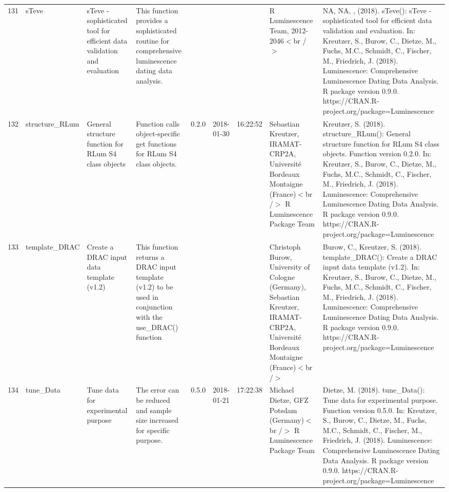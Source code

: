 \begin{table}[ht]
\begin{tabular}{rllllllll}
 \\ 
  131 & sTeve & sTeve - sophisticated tool for efficient data validation and evaluation & This function provides a sophisticated routine for comprehensive luminescence dating data analysis. &  &  &  & R Luminescence Team, 2012-2046$<$br /$>$ & NA, NA, ,  (2018). sTeve(): sTeve - sophisticated tool for efficient data validation and evaluation. In: Kreutzer, S., Burow, C., Dietze, M., Fuchs, M.C., Schmidt, C., Fischer, M., Friedrich, J. (2018). Luminescence: Comprehensive Luminescence Dating Data Analysis. R package version 0.9.0. https://CRAN.R-project.org/package=Luminescence
 \\ 
  132 & structure\_RLum & General structure function for RLum S4 class objects & Function calls object-specific get functions for RLum S4 class objects. & 0.2.0 & 2018-01-30 & 16:22:52
 & Sebastian Kreutzer, IRAMAT-CRP2A, Université Bordeaux Montaigne (France)$<$br /$>$  R Luminescence Package Team & Kreutzer, S. (2018). structure\_RLum(): General structure function for RLum S4 class objects. Function version 0.2.0. In: Kreutzer, S., Burow, C., Dietze, M., Fuchs, M.C., Schmidt, C., Fischer, M., Friedrich, J. (2018). Luminescence: Comprehensive Luminescence Dating Data Analysis. R package version 0.9.0. https://CRAN.R-project.org/package=Luminescence
 \\ 
  133 & template\_DRAC & Create a DRAC input data template (v1.2) & This function returns a DRAC input template (v1.2) to be used in conjunction with the use\_DRAC() function &  &  &  & Christoph Burow, University of Cologne (Germany), Sebastian Kreutzer, IRAMAT-CRP2A, Université Bordeaux Montaigne (France)$<$br /$>$ & Burow, C., Kreutzer, S. (2018). template\_DRAC(): Create a DRAC input data template (v1.2). In: Kreutzer, S., Burow, C., Dietze, M., Fuchs, M.C., Schmidt, C., Fischer, M., Friedrich, J. (2018). Luminescence: Comprehensive Luminescence Dating Data Analysis. R package version 0.9.0. https://CRAN.R-project.org/package=Luminescence
 \\ 
  134 & tune\_Data & Tune data for experimental purpose & The error can be reduced and sample size increased for specific purpose. & 0.5.0 & 2018-01-21 & 17:22:38
 & Michael Dietze, GFZ Potsdam (Germany)$<$br /$>$  R Luminescence Package Team & Dietze, M. (2018). tune\_Data(): Tune data for experimental purpose. Function version 0.5.0. In: Kreutzer, S., Burow, C., Dietze, M., Fuchs, M.C., Schmidt, C., Fischer, M., Friedrich, J. (2018). Luminescence: Comprehensive Luminescence Dating Data Analysis. R package version 0.9.0. https://CRAN.R-project.org/package=Luminescence

\end{tabular}
\end{table}
